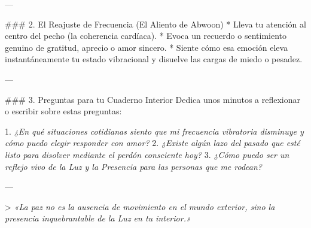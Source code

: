 \documentclass[11pt,a5paper]{book}
\begin{document}
---

### 2. El Reajuste de Frecuencia (El Aliento de Abwoon)
* Lleva tu atención al centro del pecho (la coherencia cardíaca).
* Evoca un recuerdo o sentimiento genuino de gratitud, aprecio o amor sincero.
* Siente cómo esa emoción eleva instantáneamente tu estado vibracional y disuelve las cargas de miedo o pesadez.

---

### 3. Preguntas para tu Cuaderno Interior
Dedica unos minutos a reflexionar o escribir sobre estas preguntas:

1. \textit{¿En qué situaciones cotidianas siento que mi frecuencia vibratoria disminuye y cómo puedo elegir responder con amor?}
2. \textit{¿Existe algún lazo del pasado que esté listo para disolver mediante el perdón consciente hoy?}
3. \textit{¿Cómo puedo ser un reflejo vivo de la Luz y la Presencia para las personas que me rodean?}

---

> \textit{«La paz no es la ausencia de movimiento en el mundo exterior, sino la presencia inquebrantable de la Luz en tu interior.»}

\newpage
\end{document}
